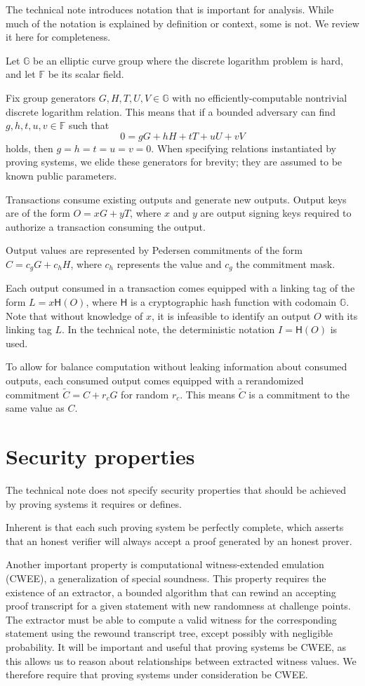 \documentclass{article}
\theoremstyle{definition}
\newcommand{\GG}{\mathbb{G}}
\newcommand{\FF}{\mathbb{F}}
\newcommand{\hash}{\mathsf{H}}
\newcommand{\wt}[1]{\widetilde{#1}}
\begin{document}
The technical note introduces notation that is important for analysis.
While much of the notation is explained by definition or context, some is not.
We review it here for completeness.

Let $\GG$ be an elliptic curve group where the discrete logarithm problem is hard, and let $\FF$ be its scalar field.

Fix group generators $G, H, T, U, V \in \GG$ with no efficiently-computable nontrivial discrete logarithm relation.
This means that if a bounded adversary can find $g, h, t, u, v \in \FF$ such that
$$0 = g G + h H + t T + u U + v V$$
holds, then $g = h = t = u = v = 0$.
When specifying relations instantiated by proving systems, we elide these generators for brevity; they are assumed to be known public parameters.

Transactions consume existing outputs and generate new outputs.
Output keys are of the form $O = x G + y T$, where $x$ and $y$ are output signing keys required to authorize a transaction consuming the output.

Output values are represented by Pedersen commitments of the form $C = c_g G + c_h H$, where $c_h$ represents the value and $c_g$ the commitment mask.

Each output consumed in a transaction comes equipped with a linking tag of the form $L = x \hash(O)$, where $\hash$ is a cryptographic hash function with codomain $\GG$.
Note that without knowledge of $x$, it is infeasible to identify an output $O$ with its linking tag $L$.
In the technical note, the deterministic notation $I = \hash(O)$ is used.

To allow for balance computation without leaking information about consumed outputs, each consumed output comes equipped with a rerandomized commitment $\wt{C} = C + r_c G$ for random $r_c$.
This means $\wt{C}$ is a commitment to the same value as $C$.


\section{Security properties}

The technical note does not specify security properties that should be achieved by proving systems it requires or defines.

Inherent is that each such proving system be perfectly complete, which asserts that an honest verifier will always accept a proof generated by an honest prover.

Another important property is computational witness-extended emulation (CWEE), a generalization of special soundness.
This property requires the existence of an extractor, a bounded algorithm that can rewind an accepting proof transcript for a given statement with new randomness at challenge points.
The extractor must be able to compute a valid witness for the corresponding statement using the rewound transcript tree, except possibly with negligible probability.
It will be important and useful that proving systems be CWEE, as this allows us to reason about relationships between extracted witness values.
We therefore require that proving systems under consideration be CWEE.
\end{document}
